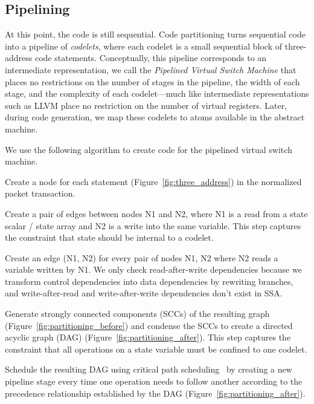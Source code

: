 \subsection{Pipelining}
\label{ss:partitioning}
At this point, the code is still sequential. Code partitioning turns sequential
code into a pipeline of \textit{codelets}, where each codelet is a small
sequential block of three-address code statements. Conceptually, this pipeline
corresponds to an intermediate representation, we call the \textit{Pipelined
Virtual Switch Machine} that places no restrictions on the number of stages in
the pipeline, the width of each stage, and the complexity of each
codelet---much like intermediate representations such as LLVM place no
restriction on the number of virtual registers. Later, during code generation,
we map these codelets to atoms available in the abstract machine.

We use the following algorithm to create code for the pipelined virtual switch
machine.
\begin{CompactEnumerate}
  \item Create a node for each statement (Figure~\ref{fig:three_address}) in
    the normalized packet transaction.
  \item Create a pair of edges between nodes N1 and N2, where N1 is a read from
    a state scalar / state array and N2 is a write into the same variable.
    This step captures the constraint that state should be internal to a
    codelet.
  \item Create an edge (N1, N2) for every pair of nodes N1, N2 where N2 reads a
    variable written by N1. We only check read-after-write dependencies because
    we transform control dependencies into data dependencies by rewriting
    branches, and write-after-read and write-after-write dependencies don't
    exist in SSA.
  \item Generate strongly connected components (SCCs) of the resulting graph
    (Figure~\ref{fig:partitioning_before}) and condense the SCCs to create a
    directed acyclic graph (DAG) (Figure~\ref{fig:partitioning_after}). This
    step captures the constraint that all operations on a state variable must
    be confined to one codelet.
  \item Schedule the resulting DAG using critical path
    scheduling~\cite{crit_path_sched} by creating a new pipeline stage every time
    one operation needs to follow another according to the precedence relationship
    established by the DAG (Figure~\ref{fig:partitioning_after}).
\end{CompactEnumerate}

